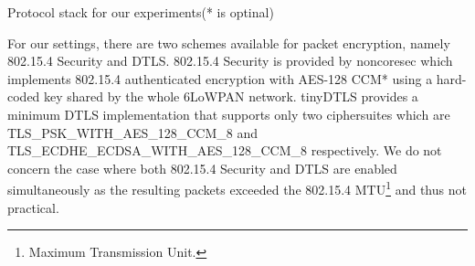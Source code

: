 \begin{table}[!h]
	\centering
	
	\caption{Protocol stack for our experiments(* is optinal)\label{Protocols}}
\end{table}


For our settings, there are two schemes available for packet encryption, namely 802.15.4 Security\cite{802154} and DTLS\cite{rfc6347}. 802.15.4 Security is provided by noncoresec\cite{noncoresec} which implements 802.15.4 authenticated encryption with AES-128 CCM*\cite{CCM} using a hard-coded key shared by the whole 6LoWPAN network. tinyDTLS\cite{tinydtls} provides a minimum DTLS implementation that supports only two ciphersuites which are TLS\_PSK\_WITH\_AES\_128\_CCM\_8\cite{rfc6655} and TLS\_ECDHE\_ECDSA\_WITH\_AES\_128\_CCM\_8\cite{rfc6655} respectively. We do not concern the case where both 802.15.4 Security and DTLS are enabled simultaneously as the resulting packets exceeded the 802.15.4 MTU\footnote{Maximum Transmission Unit.} and thus not practical.